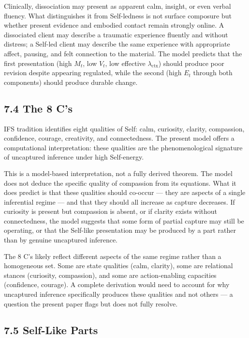 \documentclass[11pt]{article}
\begin{document}
Clinically, dissociation may present as apparent calm, insight, or even
verbal fluency. What distinguishes it from Self-ledness is not surface
composure but whether present evidence and embodied contact remain
strongly online. A dissociated client may describe a traumatic
experience fluently and without distress; a Self-led client may describe
the same experience with appropriate affect, pausing, and felt
connection to the material. The model predicts that the first
presentation (high \(M_t\), low \(V_t\), low effective
\(\lambda_{\text{ctx}}\)) should produce poor revision despite appearing
regulated, while the second (high \(E_t\) through both components)
should produce durable change.

\subsection{7.4 The 8 C's}\label{the-8-cs}

IFS tradition identifies eight qualities of Self: calm, curiosity,
clarity, compassion, confidence, courage, creativity, and connectedness.
The present model offers a computational interpretation: these qualities
are the phenomenological signature of uncaptured inference under high
Self-energy.

This is a model-based interpretation, not a fully derived theorem. The
model does not deduce the specific quality of compassion from its
equations. What it does predict is that these qualities should co-occur
--- they are aspects of a single inferential regime --- and that they
should all increase as capture decreases. If curiosity is present but
compassion is absent, or if clarity exists without connectedness, the
model suggests that some form of partial capture may still be operating,
or that the Self-like presentation may be produced by a part rather than
by genuine uncaptured inference.

The 8 C's likely reflect different aspects of the same regime rather
than a homogeneous set. Some are state qualities (calm, clarity), some
are relational stances (curiosity, compassion), and some are
action-enabling capacities (confidence, courage). A complete derivation
would need to account for why uncaptured inference specifically produces
these qualities and not others --- a question the present paper flags
but does not fully resolve.

\subsection{7.5 Self-Like Parts}\label{self-like-parts}
\end{document}
